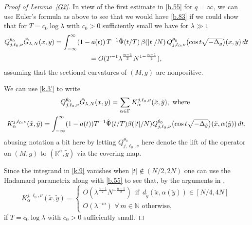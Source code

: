\documentclass[10pt]{amsart}
\newcommand{\Rn}{{\mathbb R}^n}
\newcommand{\la}{\lambda}
\newcommand{\1}{{\bf 1}}
\begin{document}
\begin{proof}[Proof of Lemma~\ref{G2}] 
In view of the first estimate in \eqref{b.55} for $q=\infty$, we can use Euler's formula as above to see that
we would have \eqref{b.83} if we could show that for $T=c_0\log\la$ with $c_0>0$ sufficiently small we have
for $\la\gg 1$
\begin{multline}\label{k.8}
Q^{\theta_0}_{j,\ell_0,\nu} \tilde G_{\la,N}(x,y)
=\int_{-\infty}^\infty (1-a(t)) \, T^{-1}  \Hat \Psi(t/T) \, \beta(|t|/N) \,
Q^{\theta_0}_{j,\ell_0,\nu}  \bigl(\cos t\sqrt{-\Delta_g}\bigr)(x,y)\, dt
\\
=O(T^{-1}\la^{\frac{n-1}2}N^{1-\frac{n-1}2}),
\end{multline}
assuming that the sectional curvatures of $(M,g)$ are nonpositive.


We can use \eqref{k.3'} to write
\begin{multline}\label{k.9}
Q^{\theta_0}_{j,\ell_0,\nu} \tilde G_{\la,N}(x,y) =\sum_{\alpha\in \Gamma}K^{j,\ell_0,\nu}_\alpha(\tilde x,\tilde y),
\, \, \text{where } 
\\
K^{j,\ell_0,\nu}_\alpha(\tilde x,\tilde y) =\int_{-\infty}^\infty (1-a(t)) T^{-1}\Hat \Psi(t/T) \beta(|t|/N)
Q^{\theta_0}_{j,\ell_0,\nu}  \bigl(\cos t\sqrt{-\Delta_{\tilde g}}\bigr)(\tilde x,\alpha (\tilde y))\, dt,
\end{multline}
abusing notation a bit here by letting $Q^{\theta_0}_{j,\ell_0,\nu}$ here denote the lift of the operator on $(M,g)$
to $(\Rn,\tilde g)$ via the covering map.


Since the integrand in \eqref{k.9} vanishes when $|t|\notin (N/2,2N)$ one can use the Hadamard parametrix along
with \eqref{b.55} to see that, by the arguments in \cite{BSTop}, 
\begin{equation}\label{k.10}
K^{j,\ell_0,\nu}_\alpha(\tilde x,\tilde y) =
\begin{cases} O(\la^{\frac{n-1}2}N^{-\frac{n-1}2}) \, \, \,
\text{if } \, d_{\tilde g}(\tilde x,\alpha(\tilde y)) \in [N/4,4N]
\\
O(\la^{-m}) \, \, \forall \, m\in {\mathbb N}\, \, \text{otherwise},
\end{cases}
\end{equation}
if $T=c_0\log\la$ with $c_0>0$ sufficiently small.



\end{proof}
\end{document}
